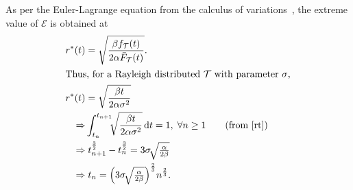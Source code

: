 As per the Euler-Lagrange equation from the calculus of variations~\cite{calcVariation2,calcVariation1}, the extreme value of $\mathcal{E}$ is obtained at 
\begin{alignat}{1}
r^*(t)&=\sqrt{\dfrac{\beta f_\mathcal{T}(t)}{2\alpha\bar{F}_\mathcal{T}(t)}}.\\
\intertext{Thus, for a Rayleigh distributed $\mathcal{T}$ with parameter $\sigma$,}
r^*(t)&=\sqrt{\dfrac{\beta t}{2\alpha\sigma^2}}\\
\Rightarrow &\int_{t_n}^{t_{n+1}}\!\!\!\sqrt{\dfrac{\beta t}{2\alpha\sigma^2}}\,\mathrm{d}t=1,\;\forall n\geq1\nonumber\tag{from \eqref{rt}}\\
\Rightarrow &\;t_{n+1}^{\frac{3}{2}}-t_{n}^{\frac{3}{2}}=3\sigma\!\sqrt{\tfrac{\alpha}{2\beta}}\nonumber\\
\Rightarrow &\;t_n=\Big(3\sigma\!\sqrt{\tfrac{\alpha}{2\beta}}\Big)^{\frac{2}{3}}n^{\frac{2}{3}}.
\end{alignat}
